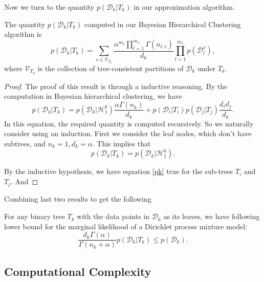 Now we turn to the quantity $p(\mathcal{D}_k|T_k)$ in our approximation algorithm.

\begin{theorem}
    The quantity $p(\mathcal{D}_k|T_k)$ computed in our Bayesian Hierarchical Clustering algorithm is
    \begin{equation}
        \label{pk}
        p(\mathcal{D}_k|T_k)=\sum_{v\in \mathcal{V}_{T_k}} \frac{\alpha^{m_v}\prod_{l=1}^{m_v} \Gamma(n_{l,v})}{d_k}\prod_{l=1}^{m_v}p(\mathcal{D}_l^v),
    \end{equation}
    where $\mathcal{V}_{T_k}$ is the collection of tree-consistent partitions of $\mathcal{D}_k$ under $T_k$.
\end{theorem}

\begin{proof}
    The proof of this result is through a inductive reasoning. By the computation in Bayesian hierarchical clustering, we have
    \begin{equation*}
        p(\mathcal{D}_k|T_k)=p(\mathcal{D}_k|\mathcal{H}_1^k) \frac{\alpha \Gamma(n_k)}{d_k}+p(\mathcal{D}_i|T_i)p(\mathcal{D}_j|T_j)\frac{d_i d_j}{d_k}.
    \end{equation*}
    In this equation, the required quantity is computed recursively. So we naturally consider using an induction. First we consider the leaf nodes, which don't have subtrees, and $n_k=1, d_k=\alpha$. This implies that 
    \begin{equation*}
        p(\mathcal{D}_k|T_k)=p(\mathcal{D}_k|\mathcal{H}_1^k).
    \end{equation*}
    
    By the inductive hypothesis, we have equation \ref{pk} true for the sub-trees $T_i$ and $T_j$. And 
\end{proof}

Combining last two results to get the following 

\begin{corollary}
For any binary tree $T_k$ with the data points in $\mathcal{D}_k$ as its leaves, we have following lower bound for the marginal likelihood of a Dirichlet process mixture model:
\begin{equation*}
     \frac{d_k \Gamma(\alpha)}{\Gamma(n_k+\alpha)} p(\mathcal{D}_k|T_k )\le p(\mathcal{D}_k).
\end{equation*}
\end{corollary}

\subsection{Computational Complexity}

